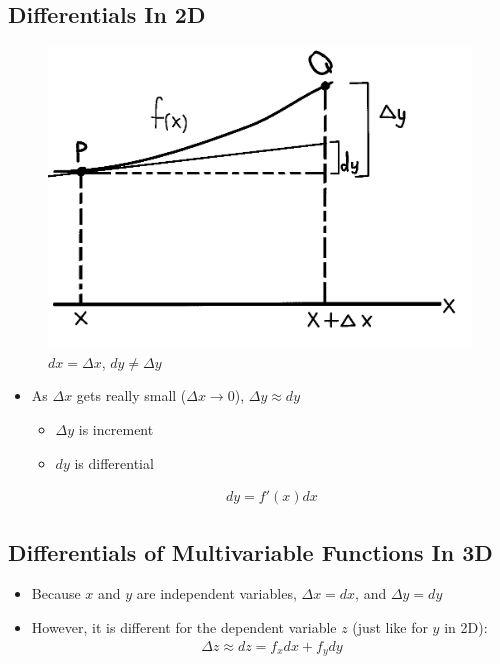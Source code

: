 \documentclass{article}
\begin{document}
\subsection{Differentials In 2D}
\begin{figure}[h]
  \includegraphics[scale=0.8]{differential-explained}
  \centering
  \caption{$dx = \Delta x$, $dy \neq \Delta y$}
  \label{fig:differential-explained}
\end{figure}
\begin{itemize}
  \item As $\Delta x$ gets really small ($\Delta x \to 0$), $\Delta y \approx dy$
  \begin{itemize}
    \item $\Delta y$ is increment
    \item $dy$ is differential
  \end{itemize}
  \begin{align}
    dy = f'(x)dx
  \end{align}
\end{itemize}

\subsection{Differentials of Multivariable Functions In 3D}
\begin{itemize}
  \item Because $x$ and $y$ are independent variables, $\Delta x = dx$, and $\Delta y = dy$
  \item However, it is different for the dependent variable $z$ (just like for $y$ in 2D):
    \begin{align}
      \Delta z \approx dz = f_x dx + f_y dy
    \end{align}
\end{itemize}
\end{document}
